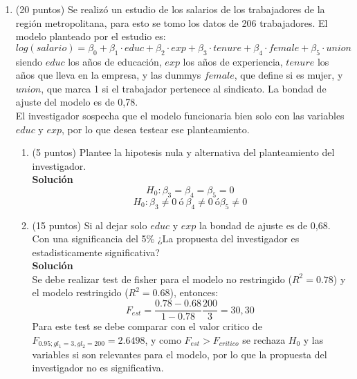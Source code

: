 \documentclass[10pt,a4paper]{article}
\begin{document}
\begin{enumerate}
\item (20 puntos) Se realizó un estudio de los salarios de los trabajadores de la región metropolitana, para esto se tomo los datos de 206 trabajadores. El modelo planteado por el estudio es:
$$log(salario) = \beta_0 + \beta_1 \cdot educ + \beta_2\cdot exp + \beta_3 \cdot tenure + \beta_4 \cdot female + \beta_5 \cdot union$$ 
siendo $educ$ los años de educación, $exp$ los años de experiencia, $tenure$ los años que lleva en la empresa, y las dummys $female$, que define si es mujer, y $union$, que marca 1 si el trabajador pertenece al sindicato. La bondad de ajuste del modelo es de 0,78. \\
El investigador sospecha que el modelo funcionaria bien solo con las variables $educ$ y $exp$, por lo que desea testear ese planteamiento. 
\begin{enumerate}
    \item (5 puntos) Plantee la hipotesis nula y alternativa del planteamiento del investigador.
    \\
    \textbf{Solución}
    \\
    $$H_0 : \beta_3=\beta_4=\beta_5 = 0$$
    $$H_0 : \beta_3 \neq 0 \ ó \ \beta_4 \neq 0 \ ó \beta_5 \neq 0$$
    \item (15 puntos) Si al dejar solo $educ$ y $exp$ la bondad de ajuste es de 0,68. Con una significancia del 5\% ¿La propuesta del investigador es estadisticamente significativa?
    \\
    \textbf{Solución}
    \\
    Se debe realizar test de fisher para el modelo no restringido ($R^2 = 0.78$) y el modelo restringido ($R^2 = 0.68$), entonces:
    $$F_{est} = \frac{0.78-0.68}{1-0.78}\frac{200}{3}=30,30$$
    Para este test se debe comparar con el valor critico de $F_{0.95;gl_1=3,gl_2=200}=2.6498$, y como $F_{est}>F_{critico}$ se rechaza $H_0$ y las variables si son relevantes para el modelo, por lo que la propuesta del investigador no es significativa.
\end{enumerate}


\end{enumerate}
\end{document}
